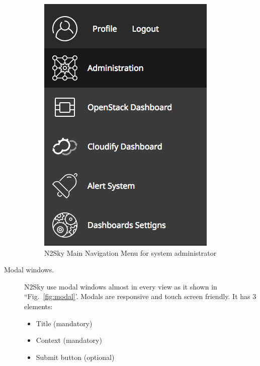 \begin{description}
 \begin{figure}[htbp]
\begin{center}
  \includegraphics[scale=0.65]{components/3/components/menu_admin.png}
  \caption{N2Sky Main Navigation Menu for system administrator}
  \label{fig:menu_admin}
\end{center}
\end{figure}

\item[Modal windows.] N2Sky use modal windows almost in every view as it shown in ``Fig.~\ref{fig:modal}'. Modals are responsive and touch screen friendly. It has 3 elements:
\begin{itemize}
\item Title (mandatory)
\item Context (mandatory)
\item Submit button (optional)
\end{itemize}


\end{description}

